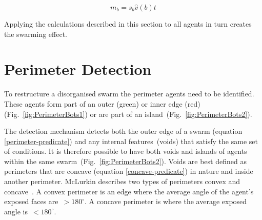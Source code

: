 \documentclass[preprint,12pt]{elsarticle}
\begin{document}
\begin{equation}\label{eq:AgentMovement}
m_b = s_b  \hat v(b)  t
\end{equation}

Applying the calculations described in this section to all agents in turn creates the swarming effect. 

\section{Perimeter Detection}\label{sec:PerimeterDetection}
To restructure a disorganised swarm the perimeter agents need to be identified. These agents form part of an outer ({\color{green}green}) or inner edge ({\color{red}red}) (Fig.~\ref{fig:PerimeterBots1}) or are part of an island~(Fig.~\ref{fig:PerimeterBots2}).

The detection mechanism detects both the outer edge of a swarm (equation
\ref{perimeter-predicate})  and any internal features~(voids) that satisfy the same
set of conditions. It is therefore possible to have both voids and islands of
agents within the same swarm~(Fig.~\ref{fig:PerimeterBots2}). Voids are best
defined as perimeters that are concave (equation \ref{concave-predicate}) in nature and inside another perimeter. McLurkin describes two types of perimeters convex and concave~\cite{MD:09}. A convex perimeter is an edge where the average angle of the agent's exposed faces are~$> 180^\circ$. A concave perimeter is where the average exposed angle is~$< 180^\circ$.

\end{document}

